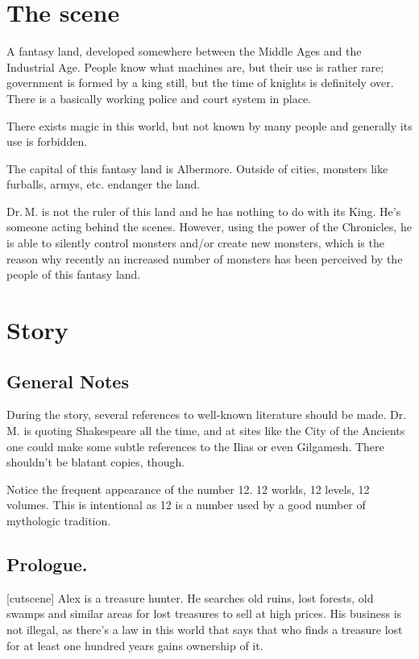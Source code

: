 \documentclass{gd-document}
\newcommand\DrM{Dr.\,M.\xspace}
\begin{document}
\section{The scene}

A fantasy land, developed somewhere between the Middle Ages and the
Industrial Age. People know what machines are, but their use is rather
rare; government is formed by a king still, but the time of knights is
definitely over. There is a basically working police and court system
in place.

There exists magic in this world, but not known by many people and
generally its use is forbidden.

The capital of this fantasy land is Albermore. Outside of cities,
monsters like furballs, armys, etc. endanger the land.

\DrM is not the ruler of this land and he has nothing to do with its
King. He’s someone acting behind the scenes. However, using the power
of the Chronicles, he is able to silently control monsters and/or
create new monsters, which is the reason why recently an increased
number of monsters has been perceived by the people of this fantasy
land.

\section{Story}

\subsection{General Notes}

During the story, several references to well-known literature should
be made. \DrM is quoting Shakespeare all the time, and at sites like
the City of the Ancients one could make some subtle references to the
Ilias or even Gilgamesh. There shouldn’t be blatant copies, though.

Notice the frequent appearance of the number 12. 12 worlds, 12 levels,
12 volumes. This is intentional as 12 is a number used by a good
number of mythologic tradition.

\subsection{Prologue.}

[cutscene]
Alex is a treasure hunter. He searches old ruins, lost forests, old
swamps and similar areas for lost treasures to sell at high
prices. His business is not illegal, as there’s a law in this world
that says that who finds a treasure lost for at least one hundred
years gains ownership of it.
\end{document}

